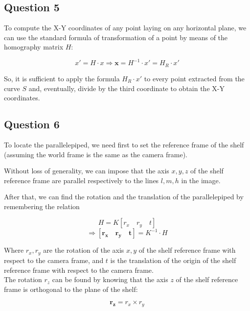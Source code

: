 \documentclass[a4paper, 11pt, oneside, openright, english]{article}
\begin{document}
\subsection{Question 5}

To compute the X-Y coordinates of any point laying on any horizontal plane, we can use the standard formula of transformation of a point by means of the homography matrix $H$:

\begin{equation}
    x' = H \cdot x \Rightarrow \mathbf{x} = H^{-1} \cdot x' = H_R \cdot x'
\end{equation}

So, it is sufficient to apply the formula $H_R \cdot x'$ to every point extracted from the curve $S$ and, eventually, divide by the third coordinate to obtain the X-Y coordinates.

\subsection{Question 6}

To locate the parallelepiped, we need first to set the reference frame of the shelf (assuming the world frame is the same as the camera frame).

Without loss of generality, we can impose that the axis $x, y, z$ of the shelf reference frame are parallel respectively to the lines $l, m, h$ in the image.

After that, we can find the rotation and the translation of the parallelepiped by remembering the relation

\begin{equation*}
    H = K[r_x \quad r_y \quad t]
\end{equation*}
\begin{equation}
    \Rightarrow [\mathbf{r_x \quad r_y \quad t}] = K^{-1} \cdot H
\end{equation}

Where $r_x, r_y$ are the rotation of the axis $x, y$ of the shelf reference frame with respect to the camera frame, and $t$ is the translation of the origin of the shelf reference frame with respect to the camera frame.\\
The rotation $r_z$ can be found by knowing that the axis $z$ of the shelf reference frame is orthogonal to the plane of the shelf:

\begin{equation}
    \mathbf{r_z} = r_x \times r_y
\end{equation}
\end{document}
